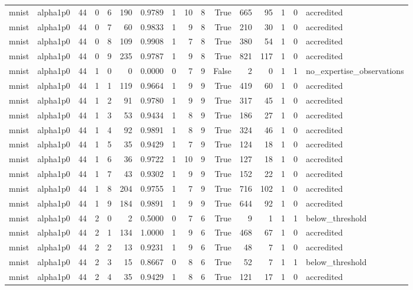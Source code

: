 \begin{tabular}{llrrrrrrrrrrrrrl}
mnist & alpha1p0 & 44 & 0 & 6 & 190 & 0.9789 & 1 & 10 & 8 & True & 665 & 95 & 1 & 0 & accredited \\
mnist & alpha1p0 & 44 & 0 & 7 & 60 & 0.9833 & 1 & 9 & 8 & True & 210 & 30 & 1 & 0 & accredited \\
mnist & alpha1p0 & 44 & 0 & 8 & 109 & 0.9908 & 1 & 7 & 8 & True & 380 & 54 & 1 & 0 & accredited \\
mnist & alpha1p0 & 44 & 0 & 9 & 235 & 0.9787 & 1 & 9 & 8 & True & 821 & 117 & 1 & 0 & accredited \\
mnist & alpha1p0 & 44 & 1 & 0 & 0 & 0.0000 & 0 & 7 & 9 & False & 2 & 0 & 1 & 1 & no\_expertise\_observations \\
mnist & alpha1p0 & 44 & 1 & 1 & 119 & 0.9664 & 1 & 9 & 9 & True & 419 & 60 & 1 & 0 & accredited \\
mnist & alpha1p0 & 44 & 1 & 2 & 91 & 0.9780 & 1 & 9 & 9 & True & 317 & 45 & 1 & 0 & accredited \\
mnist & alpha1p0 & 44 & 1 & 3 & 53 & 0.9434 & 1 & 8 & 9 & True & 186 & 27 & 1 & 0 & accredited \\
mnist & alpha1p0 & 44 & 1 & 4 & 92 & 0.9891 & 1 & 8 & 9 & True & 324 & 46 & 1 & 0 & accredited \\
mnist & alpha1p0 & 44 & 1 & 5 & 35 & 0.9429 & 1 & 7 & 9 & True & 124 & 18 & 1 & 0 & accredited \\
mnist & alpha1p0 & 44 & 1 & 6 & 36 & 0.9722 & 1 & 10 & 9 & True & 127 & 18 & 1 & 0 & accredited \\
mnist & alpha1p0 & 44 & 1 & 7 & 43 & 0.9302 & 1 & 9 & 9 & True & 152 & 22 & 1 & 0 & accredited \\
mnist & alpha1p0 & 44 & 1 & 8 & 204 & 0.9755 & 1 & 7 & 9 & True & 716 & 102 & 1 & 0 & accredited \\
mnist & alpha1p0 & 44 & 1 & 9 & 184 & 0.9891 & 1 & 9 & 9 & True & 644 & 92 & 1 & 0 & accredited \\
mnist & alpha1p0 & 44 & 2 & 0 & 2 & 0.5000 & 0 & 7 & 6 & True & 9 & 1 & 1 & 1 & below\_threshold \\
mnist & alpha1p0 & 44 & 2 & 1 & 134 & 1.0000 & 1 & 9 & 6 & True & 468 & 67 & 1 & 0 & accredited \\
mnist & alpha1p0 & 44 & 2 & 2 & 13 & 0.9231 & 1 & 9 & 6 & True & 48 & 7 & 1 & 0 & accredited \\
mnist & alpha1p0 & 44 & 2 & 3 & 15 & 0.8667 & 0 & 8 & 6 & True & 52 & 7 & 1 & 1 & below\_threshold \\
mnist & alpha1p0 & 44 & 2 & 4 & 35 & 0.9429 & 1 & 8 & 6 & True & 121 & 17 & 1 & 0 & accredited \\

\end{tabular}
